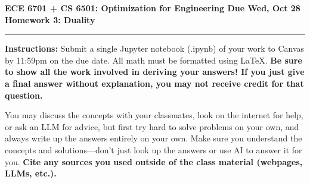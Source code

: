 \documentclass[11pt]{article}
\begin{document}
\thispagestyle{empty}
{\large{\bf ECE 6701 + CS 6501: Optimization for Engineering \hfill Due Wed, Oct
28}}\\

{\LARGE{\bf Homework 3: Duality}}
\vspace{0.2\baselineskip}
\hrule

{\bf Instructions:} Submit a single Jupyter notebook (.ipynb) of your work to
Canvas by 11:59pm on the due date. All math must be formatted using LaTeX. {\bf
  Be sure to show all the work involved in deriving your answers! If you just
  give a final answer without explanation, you may not receive credit for that
  question.}

You may discuss the concepts with your classmates, look on the internet for
help, or ask an LLM for advice, but first try hard to solve problems on your
own, and always write up the answers entirely on your own. Make sure you
understand the concepts and solutions---don't just look up the answers or use AI
to answer it for you. {\bf Cite any sources you used outside of the class
  material (webpages, LLMs, etc.).}
\end{document}
